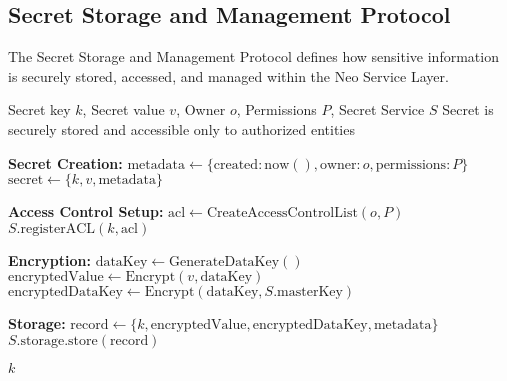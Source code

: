 \subsection{Secret Storage and Management Protocol}
\label{subsec:secret-protocol}

The Secret Storage and Management Protocol defines how sensitive information is securely stored, accessed, and managed within the Neo Service Layer.

\begin{protocol}
\label{prot:secret-storage}
\begin{algorithmic}[1]
\Require Secret key $k$, Secret value $v$, Owner $o$, Permissions $P$, Secret Service $S$
\Ensure Secret is securely stored and accessible only to authorized entities

\State \textbf{Secret Creation:}
\State $\text{metadata} \gets \{\text{created}: \text{now}(), \text{owner}: o, \text{permissions}: P\}$
\State $\text{secret} \gets \{k, v, \text{metadata}\}$

\State \textbf{Access Control Setup:}
\State $\text{acl} \gets \text{CreateAccessControlList}(o, P)$
\State $S.\text{registerACL}(k, \text{acl})$

\State \textbf{Encryption:}
\State $\text{dataKey} \gets \text{GenerateDataKey}()$
\State $\text{encryptedValue} \gets \text{Encrypt}(v, \text{dataKey})$
\State $\text{encryptedDataKey} \gets \text{Encrypt}(\text{dataKey}, S.\text{masterKey})$

\State \textbf{Storage:}
\State $\text{record} \gets \{k, \text{encryptedValue}, \text{encryptedDataKey}, \text{metadata}\}$
\State $S.\text{storage}.\text{store}(\text{record})$

\State \Return $k$
\end{algorithmic}
\end{protocol}

